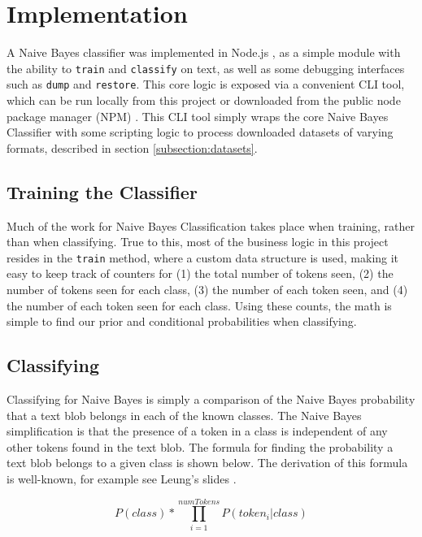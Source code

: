 \section{Implementation}
\label{section:implementation}
A Naive Bayes classifier was implemented in Node.js \cite{node}, as a simple module with the ability to \texttt{train}
and \texttt{classify} on text, as well as some debugging interfaces such as \texttt{dump} and \texttt{restore}. This
core logic is exposed via a convenient CLI tool, which can be run locally from this project or downloaded from the
public node package manager (NPM) \cite{rdn-naive-bayes}. This CLI tool simply wraps the core Naive Bayes Classifier
with some scripting logic to process downloaded datasets of varying formats, described in
section \ref{subsection:datasets}.

\subsection{Training the Classifier}
\label{subsection:training}
Much of the work for Naive Bayes Classification takes place when training, rather than when classifying. True to this,
most of the business logic in this project resides in the \texttt{train} method, where a custom data structure is used,
making it easy to keep track of counters for (1) the total number of tokens seen, (2) the number of tokens seen for each
class, (3) the number of each token seen, and (4) the number of each token seen for each class. Using these counts,
the math is simple to find our prior and conditional probabilities when classifying.

\subsection{Classifying}
\label{subsection:classifying}
Classifying for Naive Bayes is simply a comparison of the Naive Bayes probability that a text blob belongs in each of
the known classes. The Naive Bayes simplification is that the presence of a token in a class is independent of any
other tokens found in the text blob. The formula for finding the probability a text blob belongs to a given class is
shown below. The derivation of this formula is well-known, for example see Leung's slides \cite{naive-bayes-slides}.

\begin{equation}
P(class)*\prod_{i=1}^{numTokens} P(token_i | class)
\end{equation}

